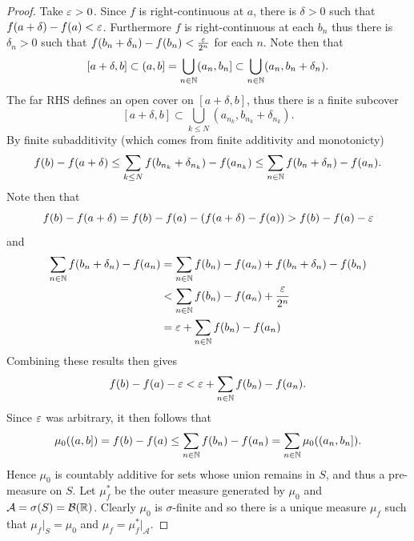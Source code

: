 \documentclass[hw_all.tex]{subfiles}
\begin{document}
\begin{proof}
    Take $\varepsilon > 0 $. Since $f$ is right-continuous at $a$, there is $\delta > 0$ such that $f(a + \delta) - f(a) < \varepsilon$. Furthermore $f$ is right-continuous at each $b_n$ thus there is $\delta_n > 0$ such that $f(b_n + \delta_n) - f(b_n) < \frac{\varepsilon}{2^n}$ for each $n$. Note then that
    \[
        [a + \delta, b] \subset (a,b] = \bigcup_{n \in \mathbb{N}} (a_n, b_n] \subset \bigcup_{n \in \mathbb{N}} (a_n, b_n + \delta_n)
    .\]
    The far RHS defines an open cover on $[a + \delta, b]$, thus there is a finite subcover 
    \[
        [a + \delta, b] \subset \bigcup_{k \leq N} (a_{n_k}, b_{n_k} + \delta_{n_k})
    .\]
    By finite subadditivity (which comes from finite additivity and monotonicty)
    \[
        f(b) - f(a + \delta) \leq \sum_{k \leq N} f(b_{n_k} + \delta_{n_k}) - f(a_{n_k}) \leq \sum_{n \in \mathbb{N}} f(b_n + \delta_n) - f(a_n)
    .\]
    Note then that
    \[
        f(b) - f(a + \delta) = f(b) - f(a) - (f(a + \delta) - f(a)) > f(b) - f(a) - \varepsilon
    \]
    and
    \begin{align*}
        \sum_{n \in \mathbb{N}} f(b_n + \delta_n) - f(a_n) &= \sum_{n \in \mathbb{N}} f(b_n) - f(a_n) + f(b_n + \delta_n) - f(b_n) \\
                                                   &< \sum_{n \in \mathbb{N}} f(b_n) - f(a_n) + \frac{\varepsilon}{2^n} \\
                                                   &= \varepsilon + \sum_{n \in \mathbb{N}} f(b_n) - f(a_n)
    \end{align*}
    Combining these results then gives
    \[
        f(b) - f(a) - \varepsilon < \varepsilon + \sum_{n \in \mathbb{N}} f(b_n) - f(a_n)
    .\]
    Since $\varepsilon$ was arbitrary, it then follows that
    \[
        \mu_0((a,b]) = f(b) - f(a) \leq \sum_{n \in \mathbb{N}} f(b_n) - f(a_n) = \sum_{n \in \mathbb{N}} \mu_0((a_n, b_n])
    .\]
    Hence $\mu_0$ is countably additive for sets whose union remains in $S$, and thus a pre-measure on $S$. Let $\mu_f^*$ be the outer measure generated by $\mu_0$ and $\mathcal{A} = \sigma(S) = \mathcal{B}(\mathbb{R})$. Clearly $\mu_0$ is $\sigma$-finite and so there is a unique measure $\mu_f$ such that $\mu_f\vert_S = \mu_0$ and $\mu_f = \mu_f^*\vert_\mathcal{A}$.


\end{proof}
\end{document}
